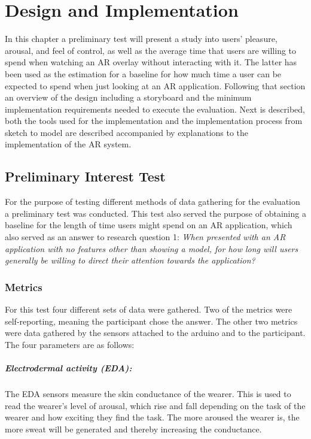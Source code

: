 \chapter{Design and Implementation}\label{ch:implementation}
In this chapter a preliminary test will present a study into users’ pleasure, arousal, and feel of control, as well as the average time that users are willing to spend when watching an AR overlay without interacting with it. The latter has been used as the estimation for a baseline for how much time a user can be expected to spend when just looking at an AR application. Following that section an overview of the design including a storyboard and the minimum implementation requirements needed to execute the evaluation. Next is described, both the tools used for the implementation and the implementation process from sketch to model are described accompanied by explanations to the implementation of the AR system. 

\section{Preliminary Interest Test}
For the purpose of testing different methods of data gathering for the evaluation a preliminary test was conducted. This test also served the purpose of obtaining a baseline for the length of time users might spend on an AR application, which also served as an answer to research question 1: \textit{When presented with an AR application with no features other than showing a model, for how long will users generally be willing to direct their attention towards the application?}


\subsection{Metrics}\label{subsec:premetrics}
For this test four different sets of data were gathered. Two of the metrics were self-reporting, meaning the participant chose the answer. The other two metrics were data gathered by the sensors attached to the arduino and to the participant. The four parameters are as follows:
\paragraph{Electrodermal activity (EDA):} The EDA sensors measure the skin conductance of the wearer. This is used to read the wearer’s level of arousal, which rise and fall depending on the task of the wearer and how exciting they find the task. The more aroused the wearer is, the more sweat will be generated and thereby increasing the conductance.

